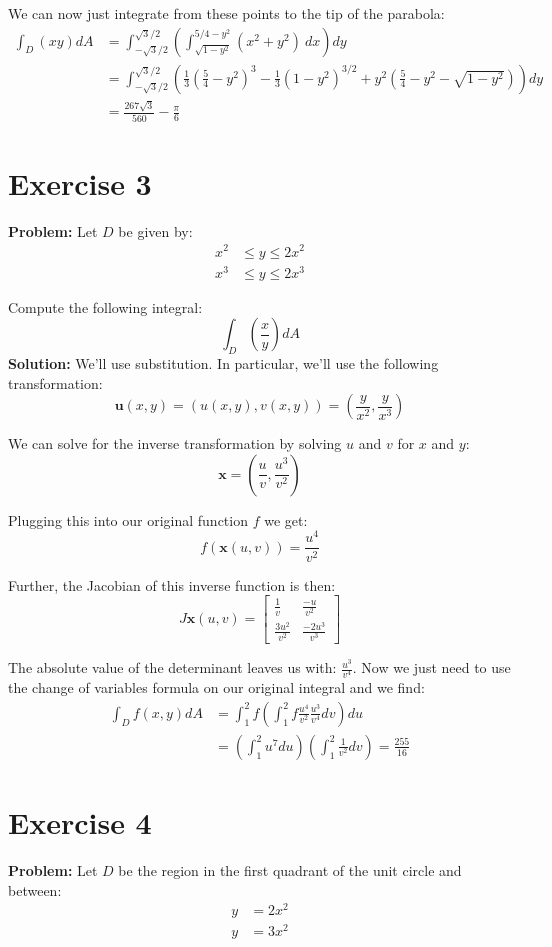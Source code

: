 \documentclass{article}
\begin{document}
We can now just integrate from these points to the tip of the parabola:
\begin{align*}
  \int_D\left(xy\right)dA&=\int_{-\sqrt 3/2}^{\sqrt 3/2}\left(\int_{\sqrt{1-y^2}}^{5/4-y^2}(x^2+y^2)\ dx\right)dy\\
  &=\int_{-\sqrt 3/2}^{\sqrt 3/2}\left(\frac{1}{3}\left(\frac{5}{4}-y^2\right)^3-\frac{1}{3}(1-y^2)^{3/2}+y^2\left(\frac{5}{4}-y^2-\sqrt{1-y^2}\right)\right)dy\\
  &=\frac{267\sqrt 3}{560}-\frac{\pi}{6}
\end{align*}

\section*{Exercise 3}
\textbf{Problem:} Let $D$ be given by:
\begin{align*}
  x^2&\le y\le2x^2\\
  x^3&\le y\le2x^3
\end{align*}

Compute the following integral:
$$\int_D\left(\frac{x}{y}\right)dA$$
\textbf{Solution:} We'll use substitution. In particular, we'll use the following transformation:
$$\mathbf u(x,y)=(u(x,y),v(x,y))=\left(\frac{y}{x^2},\frac{y}{x^3}\right)$$

We can solve for the inverse transformation by solving $u$ and $v$ for $x$ and $y$:
$$\mathbf x=\left(\frac{u}{v},\frac{u^3}{v^2}\right)$$

Plugging this into our original function $f$ we get:
$$f(\mathbf x(u,v))=\frac{u^4}{v^2}$$

Further, the Jacobian of this inverse function is then:
$$J\mathbf x(u,v)=\begin{bmatrix}
  \frac{1}{v} & \frac{-u}{v^2}\\
  \frac{3u^2}{v^2} & \frac{-2u^3}{v^3}
\end{bmatrix}$$

The absolute value of the determinant leaves us with: $\frac{u^3}{v^4}$. Now we just need to use the change of variables formula on our original integral and we find:
\begin{align*}
  \int_Df\left(x,y\right)dA&=\int_1^2f\left(\int_1^2f\frac{u^4}{v^2}\frac{u^3}{v^4}dv\right)du\\
  &=\left(\int_1^2u^7du\right)\left(\int_1^2\frac{1}{v^2}dv\right)=\frac{255}{16}
\end{align*}

\section*{Exercise 4}
\textbf{Problem:} Let $D$ be the region in the first quadrant of the unit circle and between:
\begin{align*}
  y&=2x^2\\
  y&=3x^2
\end{align*}
\end{document}
